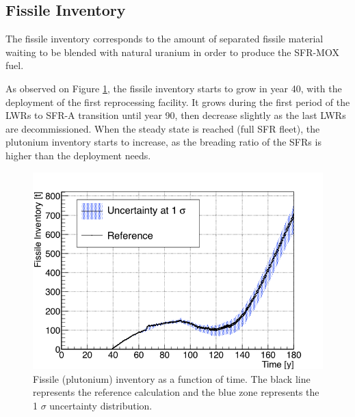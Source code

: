 \documentclass{anstrans}
\begin{document}
\subsection{Fissile Inventory}
The fissile inventory corresponds to the amount of separated fissile material waiting to
be blended with natural uranium in order to produce the \gls{SFR}-\gls{MOX} fuel.

As observed on Figure \ref{fig:pu_full}, the fissile inventory starts to grow in
year 40, with the deployment of the first reprocessing facility.  It grows
during the first period of the \glspl{LWR} to \gls{SFR}-A transition until
year 90, then decrease slightly as the last \glspl{LWR} are decommissioned.
When the steady state is reached (full \gls{SFR} fleet), the plutonium
inventory starts to increase, as the breading ratio of the \glspl{SFR} is higher
than the deployment needs.

\begin{figure}[t] %
    \centering
    \includegraphics[scale=0.3]{pu_full}
    \caption{Fissile (plutonium) inventory as a function of time.  The black line
        represents the reference calculation and the blue zone
        represents the 1 $\sigma$ uncertainty distribution.}\label{fig:pu_full}
\end{figure}
\end{document}
